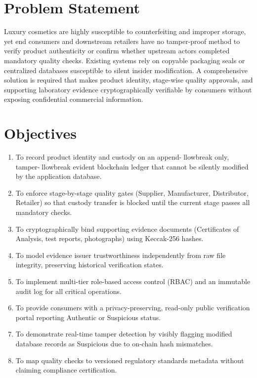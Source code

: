 \documentclass[12pt,a4paper]{report}
\begin{document}
\section{Problem Statement}
Luxury cosmetics are highly susceptible to counterfeiting and improper storage, yet end consumers and downstream retailers have no tamper-proof method to verify product authenticity or confirm whether upstream actors completed mandatory quality checks. Existing systems rely on copyable packaging seals or centralized databases susceptible to silent insider modification. A comprehensive solution is required that makes product identity, stage-wise quality approvals, and supporting laboratory evidence cryptographically verifiable by consumers without exposing confidential commercial information.

\section{Objectives}
\begin{enumerate}[leftmargin=1.8em, itemsep=3pt, parsep=0pt]
    \item To record product identity and custody on an append-llowbreak only, tamper-llowbreak evident blockchain ledger that cannot be silently modified by the application database.
    \item To enforce stage-by-stage quality gates (Supplier, Manufacturer, Distributor, Retailer) so that custody transfer is blocked until the current stage passes all mandatory checks.
    \item To cryptographically bind supporting evidence documents (Certificates of Analysis, test reports, photographs) using Keccak-256 hashes.
    \item To model evidence issuer trustworthiness independently from raw file integrity, preserving historical verification states.
    \item To implement multi-tier role-based access control (RBAC) and an immutable audit log for all critical operations.
    \item To provide consumers with a privacy-preserving, read-only public verification portal reporting Authentic or Suspicious status.
    \item To demonstrate real-time tamper detection by visibly flagging modified database records as Suspicious due to on-chain hash mismatches.
    \item To map quality checks to versioned regulatory standards metadata without claiming compliance certification.
\end{enumerate}
\end{document}
